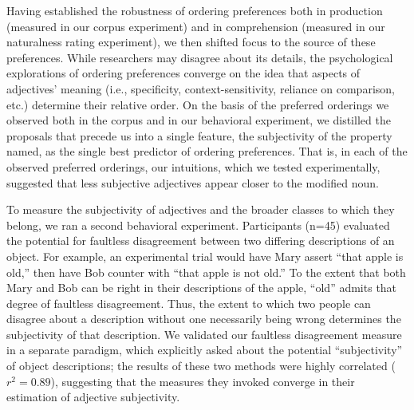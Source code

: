 \documentclass[12pt]{article}
\begin{document}
Having established the robustness of ordering preferences both in production (measured in our corpus experiment) and in comprehension (measured in our naturalness rating experiment), we then shifted focus to the source of these preferences. While researchers may disagree about its details, the psychological explorations of ordering preferences converge on the idea that aspects of  adjectives' meaning (i.e., specificity, context-sensitivity, reliance on comparison, etc.) determine their relative order.  On the basis of the preferred orderings we observed both in the corpus and in our behavioral experiment, we distilled the proposals that precede us into a single feature, the subjectivity of the property named, as the single best predictor of ordering preferences. That is, in each of the observed preferred orderings, our intuitions, which we tested experimentally, suggested that less subjective adjectives appear closer to the modified noun.


To measure the subjectivity of adjectives and the broader classes to which they belong, we ran a second behavioral experiment. Participants (n=45) evaluated the potential for faultless disagreement between two differing descriptions of an object. For example, an experimental trial would have Mary assert ``that apple is old,'' then have Bob counter with ``that apple is not old.'' 
To the extent that both Mary and Bob can be right in their descriptions of the apple, ``old'' admits that degree of faultless disagreement. 
Thus, the extent to which two people can disagree about a description without one necessarily being wrong determines the subjectivity of that description. 
We validated our faultless disagreement measure in a separate paradigm, which explicitly asked about the potential ``subjectivity'' of object descriptions; the results of these two methods were highly correlated ($r^{2} = 0.89$), suggesting that the measures they invoked converge in their estimation of adjective subjectivity.
\end{document}
